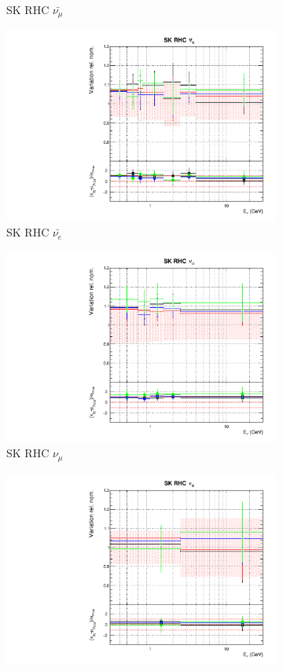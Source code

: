 \begin{figure}[t]
\begin{subfigure}{0.24\textwidth}
  \caption{SK RHC $\bar{\nu_{\mu}}$}
  \label{fig:}
\end{subfigure}
\begin{subfigure}{0.24\textwidth}
  \centering
  \includegraphics[width=0.95\linewidth]{figs/detcovbinflux_13}
  \caption{SK RHC $\bar{\nu_e}$}
  \label{fig:}
\end{subfigure}
\begin{subfigure}{0.24\textwidth}
  \centering
  \includegraphics[width=0.95\linewidth]{figs/detcovbinflux_14}
  \caption{SK RHC $\nu_{\mu}$}
  \label{fig:}
\end{subfigure}
\begin{subfigure}{0.24\textwidth}
  \centering
  \includegraphics[width=0.95\linewidth]{figs/detcovbinflux_15}

\end{subfigure}
\end{figure}

